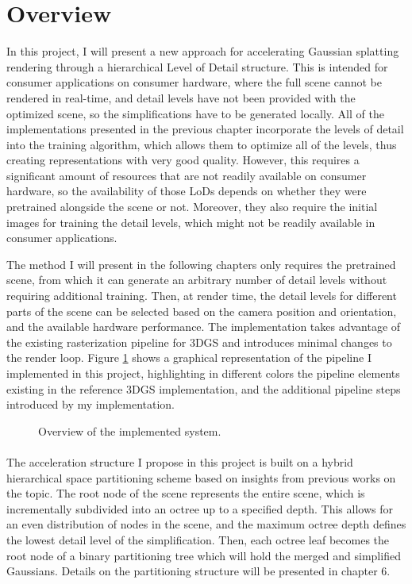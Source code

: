 \section{Overview}

In this project, I will present a new approach for accelerating Gaussian splatting rendering through a hierarchical Level of Detail structure. This is intended for consumer applications on consumer hardware, where the full scene cannot be rendered in real-time, and detail levels have not been provided with the optimized scene, so the simplifications have to be generated locally. All of the implementations presented in the previous chapter incorporate the levels of detail into the training algorithm, which allows them to optimize all of the levels, thus creating representations with very good quality. However, this requires a significant amount of resources that are not readily available on consumer hardware, so the availability of those LoDs depends on whether they were pretrained alongside the scene or not. Moreover, they also require the initial images for training the detail levels, which might not be readily available in consumer applications. 

The method I will present in the following chapters only requires the pretrained scene, from which it can generate an arbitrary number of detail levels without requiring additional training. Then, at render time, the detail levels for different parts of the scene can be selected based on the camera position and orientation, and the available hardware performance. The implementation takes advantage of the existing rasterization pipeline for 3DGS and introduces minimal changes to the render loop. Figure \ref{fig:system} shows a graphical representation of the pipeline I implemented in this project, highlighting in different colors the pipeline elements existing in the reference 3DGS implementation, and the additional pipeline steps introduced by my implementation.

\begin{figure}[H]
    \centering
    
    \caption{Overview of the implemented system.}
    \label{fig:system}
\end{figure}

\paragraph{}
The acceleration structure I propose in this project is built on a hybrid hierarchical space partitioning scheme based on insights from previous works on the topic. The root node of the scene represents the entire scene, which is incrementally subdivided into an octree up to a specified depth. This allows for an even distribution of nodes in the scene, and the maximum octree depth defines the lowest detail level of the simplification. Then, each octree leaf becomes the root node of a binary partitioning tree which will hold the merged and simplified Gaussians. Details on the partitioning structure will be presented in chapter 6.

